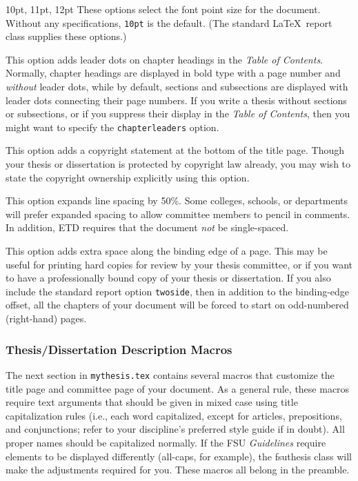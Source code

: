 \documentclass[11pt,letterpaper]{ltxdockit}[2011/03/25]
\newcommand*{\booktitle}[1]{\textit{#1}}
\newcommand*{\complit}[1]{\texttt{#1}}
\newcommand*{\pkg}[1]{\textsf{#1}}
\newcommand*{\fsuth}{\pkg{fsuthesis}}
\renewcommand{\-}{\discretionary{}{}{}}
\newenvironment*{macrolist}
  {\list{}{%
      \setlength{\labelwidth}{1.5in}
      \setlength{\labelsep}{10pt}
      \setlength{\leftmargin}{0pt}
      \setlength{\parsep}{0pt}
      \setlength{\listparindent}{\parindent}
      \renewcommand*{\makelabel}[1]{{\setbox0=\hbox{\parbox[t]{1.5in}{\raggedleft\leavevmode\marglistfont##1}}\dp0=0pt\box0}}}}
  {\endlist}
\def\plainitem#1{#1\\}
\def\optionitems#1{\item[\listofitems{\plainitem}{#1}]}
\begin{document}
\begin{macrolist}
\item[10pt, 11pt, 12pt] These options select the font point size for
  the document.  Without any
  specifications, \complit{10pt} is the default.  (The standard
  \LaTeX\ \pkg{report} class supplies these options.)

\optionitems{chapterleaders}
This option adds leader dots on chapter headings in the \textsl{Table
  of Contents}.
%
%
Normally, chapter headings are displayed in bold type with a page
number and \emph{without} leader dots, while by default, sections and
subsections are displayed with leader dots connecting their page
numbers.  If you write a thesis without sections or subsections, or if
you suppress their display in the \textsl{Table of Contents}, then you
might want to specify the \complit{chapterleaders} option.

\optionitems{copyright}
This option adds a copyright
statement at the bottom of the title page.  Though your thesis or
dissertation is protected by copyright law already, you may wish to
state the copyright ownership explicitly using this option.

\optionitems{expanded}
This option expands line
spacing by 50\%.
Some colleges, schools, or departments will prefer expanded spacing to
allow committee members to pencil in comments.  In addition, ETD
requires that the document \emph{not} be single-spaced.

\optionitems{hardcopy}
This option adds extra space along the binding edge of a page.  This
may be useful for printing hard copies
for review by your thesis committee, or if you want to have a
professionally bound copy of your thesis or dissertation.  If you also
include the standard \pkg{report} option
\complit{twoside}, then in addition to
the binding-edge offset, all the chapters of your document will be
forced to start on odd-numbered (right-hand) pages.

\end{macrolist}

\subsubsection{Thesis/Dissertation Description Macros}
The next section in \complit{mythesis.tex} contains several macros
that customize the title page and committee page of your document.  As
a general rule, these macros require text arguments that should be
given in mixed case using title capitalization
rules (i.e., each word capitalized, except for articles, prepositions,
and conjunctions; refer to your discipline's preferred style guide if
in doubt).  All proper names should be capitalized normally.  If the
FSU \booktitle{Guidelines} require elements to be displayed
differently (all-caps, for example), the \fsuth{} class will make the
adjustments required for you.  These macros all belong in the
preamble.
\end{document}
